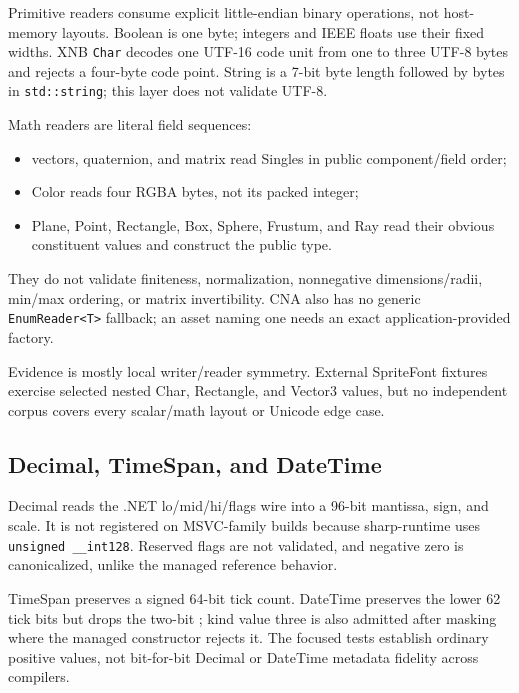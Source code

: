 Primitive readers consume explicit little-endian binary operations, not host-memory layouts.
Boolean is one byte; integers and IEEE floats use their fixed widths. XNB \texttt{Char} decodes
one UTF-16 code unit from one to three UTF-8 bytes and rejects a four-byte code point. String is a
7-bit byte length followed by bytes in \texttt{std::string}; this layer does not validate UTF-8.

Math readers are literal field sequences:

\begin{itemize}
  \item vectors, quaternion, and matrix read Singles in public component/field order;
  \item Color reads four RGBA bytes, not its packed integer;
  \item Plane, Point, Rectangle, Box, Sphere, Frustum, and Ray read their obvious constituent
        values and construct the public type.
\end{itemize}

They do not validate finiteness, normalization, nonnegative dimensions/radii, min/max ordering,
or matrix invertibility. CNA also has no generic \texttt{EnumReader<T>} fallback; an asset naming
one needs an exact application-provided factory.

Evidence is mostly local writer/reader symmetry. External SpriteFont fixtures exercise selected
nested Char, Rectangle, and Vector3 values, but no independent corpus covers every scalar/math
layout or Unicode edge case.

\subsection{Decimal, TimeSpan, and DateTime}
\label{sec:xnb-decimal-datetime-reader-contract}

Decimal reads the .NET lo/mid/hi/flags wire into a 96-bit mantissa, sign, and scale. It is not
registered on MSVC-family builds because sharp-runtime uses \texttt{unsigned \_\_int128}.
Reserved flags are not validated, and negative zero is canonicalized, unlike the managed
reference behavior.

TimeSpan preserves a signed 64-bit tick count. DateTime preserves the lower 62 tick bits but
drops the two-bit ; kind value three is also admitted after masking where
the managed constructor rejects it. The focused tests establish ordinary positive values, not
bit-for-bit Decimal or DateTime metadata fidelity across compilers.

